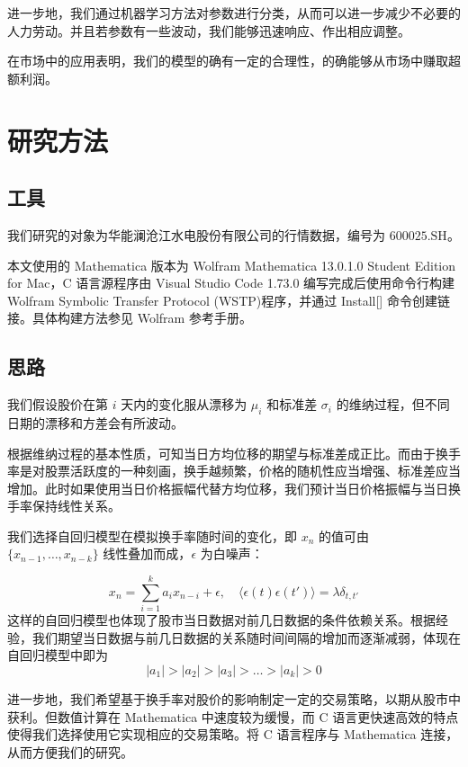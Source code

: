 \documentclass{ctexart}
\newcommand{\0}{\boldsymbol{0}}
\begin{document}
进一步地，我们通过机器学习方法对参数进行分类，从而可以进一步减少不必要的人力劳动。并且若参数有一些波动，我们能够迅速响应、作出相应调整。

在市场中的应用表明，我们的模型的确有一定的合理性，的确能够从市场中赚取超额利润。



\section{研究方法}

\subsection{工具}

我们研究的对象为华能澜沧江水电股份有限公司的行情数据，编号为 $600025.\text{SH}$。

本文使用的 Mathematica 版本为 Wolfram Mathematica 13.0.1.0 Student Edition for Mac，C 语言源程序由 Visual Studio Code 1.73.0 编写完成后使用命令行构建 Wolfram Symbolic Transfer Protocol (WSTP)程序，并通过 Install[] 命令创建链接。具体构建方法参见 Wolfram 参考手册。



\subsection{思路}

我们假设股价在第 $i$ 天内的变化服从漂移为 $\mu_i$  和标准差 $\sigma_i$  的维纳过程，但不同日期的漂移和方差会有所波动。

根据维纳过程的基本性质，可知当日方均位移的期望与标准差成正比\cite{Statistical}。而由于换手率是对股票活跃度的一种刻画，换手越频繁，价格的随机性应当增强、标准差应当增加。此时如果使用当日价格振幅代替方均位移，我们预计当日价格振幅与当日换手率保持线性关系。

我们选择自回归模型在模拟换手率随时间的变化，即 $x_{n}$ 的值可由 $\{x_{n-1} ,\dots,x_{n-k}\}$ 线性叠加而成，$\epsilon$ 为白噪声：

\[
    x_{n} = \sum_{i=1}^k a_i x_{n-i} + \epsilon,\quad \langle \epsilon(t)\epsilon(t')\rangle  = \lambda \delta_{t,t'}
\]
这样的自回归模型也体现了股市当日数据对前几日数据的条件依赖关系。根据经验，我们期望当日数据与前几日数据的关系随时间间隔的增加而逐渐减弱，体现在自回归模型中即为
\[
    |a_1| > |a_2| > |a_3| >\dots > |a_k| >0
\]

进一步地，我们希望基于换手率对股价的影响制定一定的交易策略，以期从股市中获利。但数值计算在 Mathematica 中速度较为缓慢，而 C 语言更快速高效的特点使得我们选择使用它实现相应的交易策略。将 C 语言程序与 Mathematica 连接，从而方便我们的研究。
\end{document}
